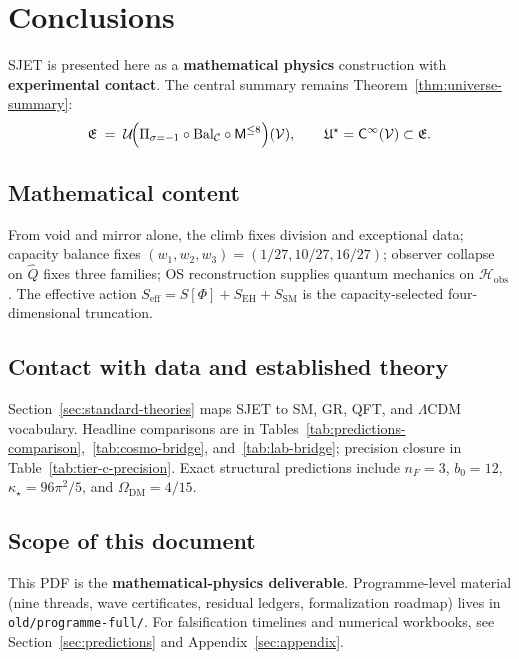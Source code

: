 \documentclass[11pt]{article}
\theoremstyle{plain}
\theoremstyle{definition}
\theoremstyle{remark}
\numberwithin{equation}{section}
\newcommand{\Void}{\mathcal{V}}
\newcommand{\Mirror}{\mathsf{M}}
\newcommand{\Climb}{\mathsf{C}}
\newcommand{\orderparam}{\Phi}
\begin{document}
\section{Conclusions}
\label{sec:conclusions}

SJET is presented here as a \textbf{mathematical physics} construction with
\textbf{experimental contact}. The central summary remains
Theorem~\ref{thm:universe-summary}:
\begin{equation}
  \mathfrak{E}
  \;=\;
  \mathcal{U}\!\Bigl(
    \Pi_{\sigma=-1}\circ\mathrm{Bal}_{\mathcal{C}}\circ\Mirror^{\leq 8}
  \Bigr)(\Void),
  \qquad
  \mathfrak{U}^\star=\Climb^\infty(\Void)\subset\mathfrak{E}.
\end{equation}

\subsection{Mathematical content}

From void and mirror alone, the climb fixes division and exceptional data;
capacity balance fixes $(w_1,w_2,w_3)=(1/27,10/27,16/27)$; observer collapse
on $\hat Q$ fixes three families; OS reconstruction supplies quantum mechanics
on $\mathcal{H}_{\mathrm{obs}}$. The effective action
$S_{\mathrm{eff}}=S[\orderparam]+S_{\mathrm{EH}}+S_{\mathrm{SM}}$ is the
capacity-selected four-dimensional truncation.

\subsection{Contact with data and established theory}

Section~\ref{sec:standard-theories} maps SJET to SM, GR, QFT, and $\Lambda$CDM
vocabulary. Headline comparisons are in
Tables~\ref{tab:predictions-comparison},~\ref{tab:cosmo-bridge},
and~\ref{tab:lab-bridge}; precision closure in
Table~\ref{tab:tier-c-precision}. Exact structural predictions include
$n_F=3$, $b_0=12$, $\kappa_\star=96\pi^2/5$, and $\Omega_{\mathrm{DM}}=4/15$.

\subsection{Scope of this document}

This PDF is the \textbf{mathematical-physics deliverable}. Programme-level
material (nine threads, wave certificates, residual ledgers, formalization
roadmap) lives in \texttt{old/programme-full/}. For falsification timelines
and numerical workbooks, see Section~\ref{sec:predictions} and
Appendix~\ref{sec:appendix}.
\end{document}
